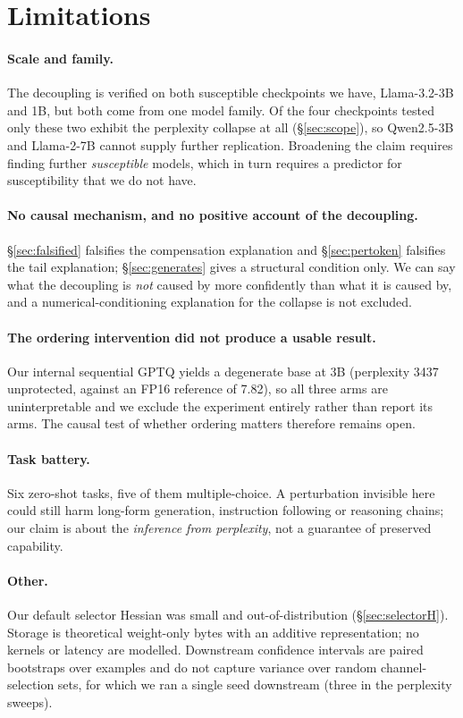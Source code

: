 \documentclass[11pt]{article}
\begin{document}
\section*{Limitations}

\paragraph{Scale and family.} The decoupling is verified on both susceptible checkpoints we
have, Llama-3.2-3B and 1B, but both come from one model family. Of the four checkpoints tested
only these two exhibit the perplexity collapse at all (\S\ref{sec:scope}), so Qwen2.5-3B and
Llama-2-7B cannot supply further replication. Broadening the claim requires finding further
\emph{susceptible} models, which in turn requires a predictor for susceptibility that we do not
have.

\paragraph{No causal mechanism, and no positive account of the decoupling.}
\S\ref{sec:falsified} falsifies the compensation explanation and \S\ref{sec:pertoken} falsifies
the tail explanation; \S\ref{sec:generates} gives a structural condition only. We can say what
the decoupling is \emph{not} caused by more confidently than what it is caused by, and a
numerical-conditioning explanation for the collapse is not excluded.

\paragraph{The ordering intervention did not produce a usable result.} Our internal sequential
GPTQ yields a degenerate base at 3B (perplexity 3437 unprotected, against an FP16 reference of
7.82), so all three arms are uninterpretable and we exclude the experiment entirely rather than
report its arms. The causal test of whether ordering matters therefore remains open.

\paragraph{Task battery.} Six zero-shot tasks, five of them multiple-choice. A perturbation
invisible here could still harm long-form generation, instruction following or reasoning chains;
our claim is about the \emph{inference from perplexity}, not a guarantee of preserved
capability.

\paragraph{Other.} Our default selector Hessian was small and out-of-distribution
(\S\ref{sec:selectorH}). Storage is theoretical weight-only bytes with an additive
representation; no kernels or latency are modelled. Downstream confidence intervals are paired
bootstraps over examples and do not capture variance over random channel-selection sets, for
which we ran a single seed downstream (three in the perplexity sweeps).
\end{document}
